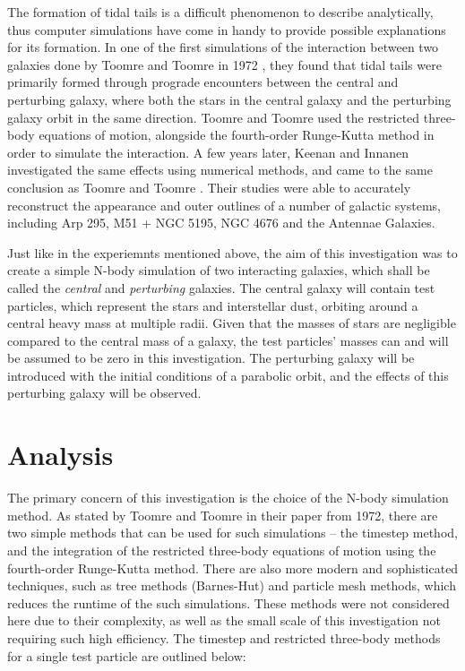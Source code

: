 \documentclass[twoside,twocolumn]{article}
\begin{document}
    The formation of tidal tails is a difficult phenomenon to describe analytically, thus computer simulations have come in handy to provide possible explanations for its formation. In one of the first simulations of the interaction between two galaxies done by Toomre and Toomre in 1972 \cite{toomre}, they found that tidal tails were primarily formed through prograde encounters between the central and perturbing galaxy, where both the stars in the central galaxy and the perturbing galaxy orbit in the same direction. Toomre and Toomre used the restricted three-body equations of motion, alongside the fourth-order Runge-Kutta method in order to simulate the interaction. A few years later, Keenan and Innanen investigated the same effects using numerical methods, and came to the same conclusion as Toomre and Toomre \cite{keenan}. Their studies were able to accurately reconstruct the appearance and outer outlines of a number of galactic systems, including Arp 295, M51 + NGC 5195, NGC 4676 and the Antennae Galaxies.

    Just like in the experiemnts mentioned above, the aim of this investigation was to create a simple N-body simulation of two interacting galaxies, which shall be called the \emph{central} and \emph{perturbing} galaxies. The central galaxy will contain test particles, which represent the stars and interstellar dust, orbiting around a central heavy mass at multiple radii. Given that the masses of stars are negligible compared to the central mass of a galaxy, the test particles' masses can and will be assumed to be zero in this investigation. The perturbing galaxy will be introduced with the initial conditions of a parabolic orbit, and the effects of this perturbing galaxy will be observed.


\section{Analysis}    

    The primary concern of this investigation is the choice of the N-body simulation method. As stated by Toomre and Toomre in their paper from 1972, there are two simple methods that can be used for such simulations -- the timestep method, and the integration of the restricted three-body equations of motion using the fourth-order Runge-Kutta method. There are also more modern and sophisticated techniques, such as tree methods (Barnes-Hut) and particle mesh methods, which reduces the runtime of the such simulations. These methods were not considered here due to their complexity, as well as the small scale of this investigation not requiring such high efficiency. The timestep and restricted three-body methods for a single test particle are outlined below:
    \vspace{0.2cm}
\end{document}
